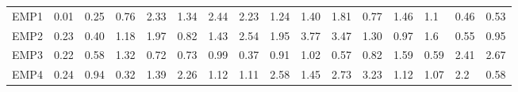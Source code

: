 \documentclass{tPRS2e}
\begin{document}
\begin{table}[h]
{\begin{tabular}{l|lllllllllllllll}
		EMP1 & 0.01                  & 0.25                  & 0.76                  & 2.33                  & 1.34                  & 2.44                  & 2.23                  & 1.24                  & 1.40                  & 1.81                   & 0.77                   & 1.46                   & 1.1                    & 0.46                   & 0.53                   \\
		EMP2 & 0.23                  & 0.40                  & 1.18                  & 1.97                  & 0.82                  & 1.43                  & 2.54                  & 1.95                  & 3.77                  & 3.47                   & 1.30                   & 0.97                   & 1.6                    & 0.55                   & 0.95                   \\
		EMP3 & 0.22                  & 0.58                  & 1.32                  & 0.72                  & 0.73                  & 0.99                  & 0.37                  & 0.91                  & 1.02                  & 0.57                   & 0.82                   & 1.59                   & 0.59                   & 2.41                   & 2.67                   \\
		EMP4 & 0.24                  & 0.94                  & 0.32                  & 1.39                  & 2.26                  & 1.12                  & 1.11                  & 2.58                  & 1.45                  & 2.73                   & 3.23                   & 1.12                   & 1.07                   & 2.2                    & 0.58                  
	\end{tabular}}
\end{table}
\end{document}
